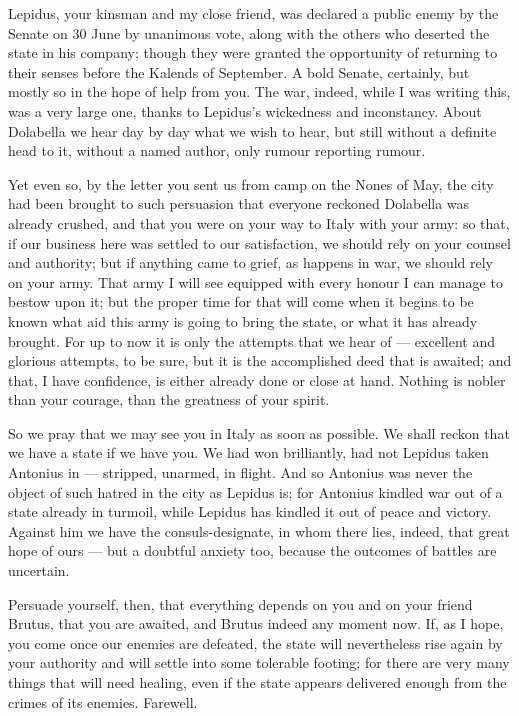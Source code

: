 

 Lepidus, your kinsman and my close friend, was declared a public enemy by the Senate on 30 June by unanimous vote, along with the others who deserted the state in his company; though they were granted the opportunity of returning to their senses before the Kalends of September. A bold Senate, certainly, but mostly so in the hope of help from you. The war, indeed, while I was writing this, was a very large one, thanks to Lepidus's wickedness and inconstancy. About Dolabella we hear day by day what we wish to hear, but still without a definite head to it, without a named author, only rumour reporting rumour.

 Yet even so, by the letter you sent us from camp on the Nones of May, the city had been brought to such persuasion that everyone reckoned Dolabella was already crushed, and that you were on your way to Italy with your army: so that, if our business here was settled to our satisfaction, we should rely on your counsel and authority; but if anything came to grief, as happens in war, we should rely on your army. That army I will see equipped with every honour I can manage to bestow upon it; but the proper time for that will come when it begins to be known what aid this army is going to bring the state, or what it has already brought. For up to now it is only the attempts that we hear of --- excellent and glorious attempts, to be sure, but it is the accomplished deed that is awaited; and that, I have confidence, is either already done or close at hand. Nothing is nobler than your courage, than the greatness of your spirit.

 So we pray that we may see you in Italy as soon as possible. We shall reckon that we have a state if we have you. We had won brilliantly, had not Lepidus taken Antonius in --- stripped, unarmed, in flight. And so Antonius was never the object of such hatred in the city as Lepidus is; for Antonius kindled war out of a state already in turmoil, while Lepidus has kindled it out of peace and victory. Against him we have the consuls-designate, in whom there lies, indeed, that great hope of ours --- but a doubtful anxiety too, because the outcomes of battles are uncertain.

 Persuade yourself, then, that everything depends on you and on your friend Brutus, that you are awaited, and Brutus indeed any moment now. If, as I hope, you come once our enemies are defeated, the state will nevertheless rise again by your authority and will settle into some tolerable footing; for there are very many things that will need healing, even if the state appears delivered enough from the crimes of its enemies. Farewell.
